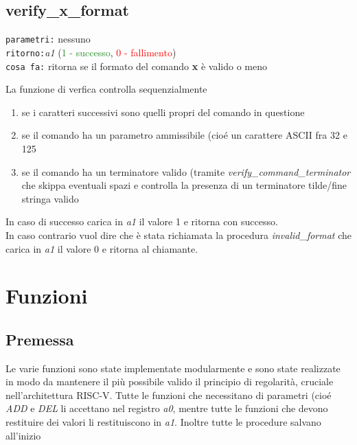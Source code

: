 \documentclass[11pt]{report}
\begin{document}
    \section{verify\_\textbf{x}\_format}
    
    \begin{mdframed}
        \texttt{parametri:} nessuno \\
         \texttt{ritorno:}\textit{a1}  (\textcolor{ForestGreen}{1 - successo}, \textcolor{Red}{0 - fallimento})\\
         \texttt{cosa fa:} ritorna se il formato del comando \textbf{x} è valido o meno

    \end{mdframed}
    La funzione di verfica controlla sequenzialmente
    \begin{enumerate}
        \item se i caratteri successivi sono quelli propri del comando in questione
        \item se il comando ha un parametro ammissibile (cioé un carattere ASCII fra 32 e 125
        \item se il comando ha un terminatore valido (tramite \textit{verify\_command\_terminator} che skippa eventuali spazi e controlla la presenza di un terminatore tilde/fine stringa valido 
        
    \end{enumerate}
    In caso di successo carica in \textit{a1} il valore 1 e ritorna con successo.\\
    In caso contrario vuol dire che è stata richiamata la procedura \textit{invalid\_format} che carica in \textit{a1} il valore 0 e ritorna al chiamante.
    \newpage
    \chapter{Funzioni}
    \justifying
    \section{Premessa}
    Le varie funzioni sono state implementate modularmente e sono state realizzate in modo da mantenere il più possibile valido il principio di regolarità, cruciale nell'architettura RISC-V. Tutte le funzioni che necessitano di parametri (cioé \textit{ADD} e \textit{DEL} li accettano nel registro \textit{a0}, mentre tutte le funzioni che devono restituire dei valori li restituiscono in \textit{a1}. Inoltre tutte le procedure salvano all'inizio
\end{document}
